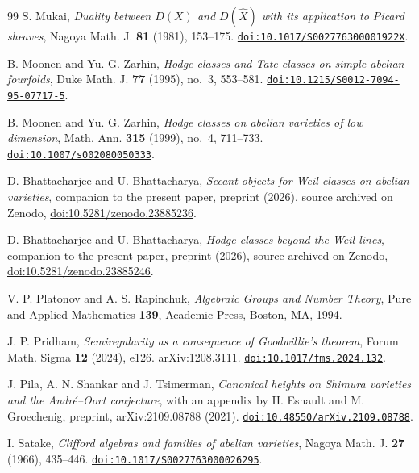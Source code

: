 \begin{thebibliography}{99}
S. Mukai,
\emph{Duality between $D(X)$ and $D(\hat{X})$ with its application to Picard
sheaves},
Nagoya Math. J. \textbf{81} (1981), 153--175.
\href{https://doi.org/10.1017/S002776300001922X}{\texttt{doi:10.1017/S002776300001922X}}.

B. Moonen and Yu. G. Zarhin,
\emph{Hodge classes and Tate classes on simple abelian fourfolds},
Duke Math. J. \textbf{77} (1995), no.~3, 553--581.
\href{https://doi.org/10.1215/S0012-7094-95-07717-5}{\texttt{doi:10.1215/S0012-7094-95-07717-5}}.

B. Moonen and Yu. G. Zarhin,
\emph{Hodge classes on abelian varieties of low dimension},
Math. Ann. \textbf{315} (1999), no.~4, 711--733.
\href{https://doi.org/10.1007/s002080050333}{\texttt{doi:10.1007/s002080050333}}.

D. Bhattacharjee and U. Bhattacharya,
\emph{Secant objects for Weil classes on abelian varieties},
companion to the present paper, preprint (2026), source archived on Zenodo,
\href{https://doi.org/10.5281/zenodo.23885236}{doi:10.5281/zenodo.23885236}.

D. Bhattacharjee and U. Bhattacharya,
\emph{Hodge classes beyond the Weil lines},
companion to the present paper, preprint (2026), source archived on Zenodo,
\href{https://doi.org/10.5281/zenodo.23885246}{doi:10.5281/zenodo.23885246}.

V. P. Platonov and A. S. Rapinchuk,
\emph{Algebraic Groups and Number Theory},
Pure and Applied Mathematics \textbf{139},
Academic Press, Boston, MA, 1994.

J. P. Pridham,
\emph{Semiregularity as a consequence of Goodwillie's theorem},
Forum Math. Sigma \textbf{12} (2024), e126. arXiv:1208.3111.
\href{https://doi.org/10.1017/fms.2024.132}{\texttt{doi:10.1017/fms.2024.132}}.

J. Pila, A. N. Shankar and J. Tsimerman,
\emph{Canonical heights on Shimura varieties and the Andr\'e--Oort
conjecture}, with an appendix by H. Esnault and M. Groechenig,
preprint, arXiv:2109.08788 (2021).
\href{https://doi.org/10.48550/arXiv.2109.08788}{\texttt{doi:10.48550/arXiv.2109.08788}}.

I. Satake,
\emph{Clifford algebras and families of abelian varieties},
Nagoya Math. J. \textbf{27} (1966), 435--446.
\href{https://doi.org/10.1017/S0027763000026295}{\texttt{doi:10.1017/S0027763000026295}}.


\end{thebibliography}
